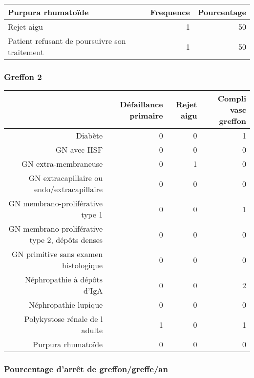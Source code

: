 \documentclass[11pt,a4paper]{article}\usepackage[]{graphicx}\usepackage[]{color}
\begin{document}
\begin{table}[H]
\centering
\begin{tabular}{lrr}
  \hline
Purpura rhumatoïde & Frequence & Pourcentage \\ 
  \hline
Rejet aigu & 1 & 50 \\ 
  Patient refusant de poursuivre son traitement & 1 & 50 \\ 
   \hline
\end{tabular}
\end{table}


\subsubsection*{Greffon 2}

\begin{table}[H]
\centering
\begin{tabular}{rrrr}
  \hline
 & Défaillance primaire & Rejet aigu & Compli vasc greffon \\ 
  \hline
Diabète &   0 &   0 &   1 \\ 
  GN avec HSF &   0 &   0 &   0 \\ 
  GN extra-membraneuse &   0 &   1 &   0 \\ 
  GN extracapillaire ou endo/extracapillaire &   0 &   0 &   0 \\ 
  GN membrano-proliférative type 1 &   0 &   0 &   1 \\ 
  GN membrano-proliférative type 2, dépôts denses &   0 &   0 &   0 \\ 
  GN primitive sans examen histologique &   0 &   0 &   0 \\ 
  Néphropathie à dépôts d'IgA &   0 &   0 &   2 \\ 
  Néphropathie lupique &   0 &   0 &   0 \\ 
  Polykystose rénale de l adulte &   1 &   0 &   1 \\ 
  Purpura rhumatoïde &   0 &   0 &   0 \\ 
   \hline
\end{tabular}
\end{table}


    \subsubsection{Pourcentage d'arrêt de greffon/greffe/an}
\end{document}
